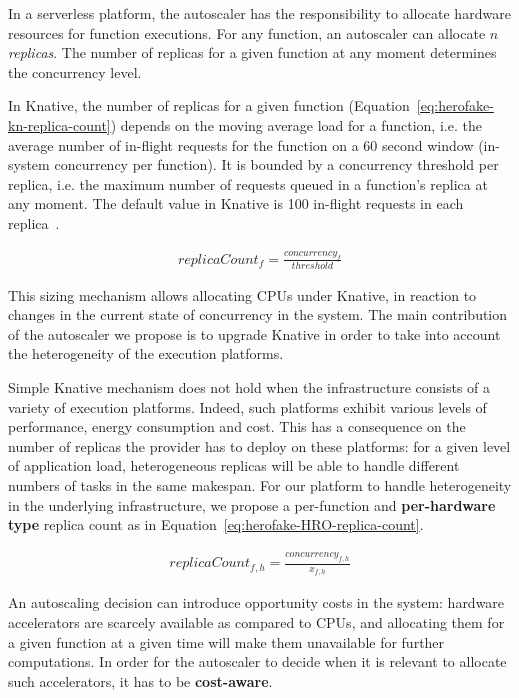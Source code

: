In a serverless platform, the autoscaler has the responsibility to allocate hardware resources for function executions. For any function, an autoscaler can allocate $n$ \textit{replicas}. The number of replicas for a given function at any moment determines the concurrency level.

In Knative, the number of replicas for a given function (Equation~\ref{eq:herofake-kn-replica-count}) depends on the moving average load for a function, i.e. the average number of in-flight requests for the function on a 60 second window (in-system concurrency per function). It is bounded by a concurrency threshold per replica, i.e. the maximum number of requests queued in a function's replica at any moment. The default value in Knative is 100 in-flight requests in each replica~\cite{knative-autoscaling}.

\begin{equation}
\begin{split}
    replicaCount_{f} = \frac{concurrency_{f}}{threshold}
\end{split}
\label{eq:herofake-kn-replica-count}
\end{equation}

This sizing mechanism allows allocating CPUs under Knative, in reaction to changes in the current state of concurrency in the system. The main contribution of the autoscaler we propose is to upgrade Knative in order to take into account the heterogeneity of the execution platforms.

Simple Knative mechanism does not hold when the infrastructure consists of a variety of execution platforms. Indeed, such platforms exhibit various levels of performance, energy consumption and cost. This has a consequence on the number of replicas the provider has to deploy on these platforms: for a given level of application load, heterogeneous replicas will be able to handle different numbers of tasks in the same makespan. For our platform to handle heterogeneity in the underlying infrastructure, we propose a per-function and \textbf{per-hardware type} replica count as in Equation~\ref{eq:herofake-HRO-replica-count}.

\begin{equation}
\begin{split}
    replicaCount_{f, h} = \frac{concurrency_{f, h}}{x_{f, h}}
\end{split}
\label{eq:herofake-HRO-replica-count}
\end{equation}

An autoscaling decision can introduce opportunity costs in the system: hardware accelerators are scarcely available as compared to CPUs, and allocating them for a given function at a given time will make them unavailable for further computations. In order for the autoscaler to decide when it is relevant to allocate such accelerators, it has to be \textbf{cost-aware}. 

